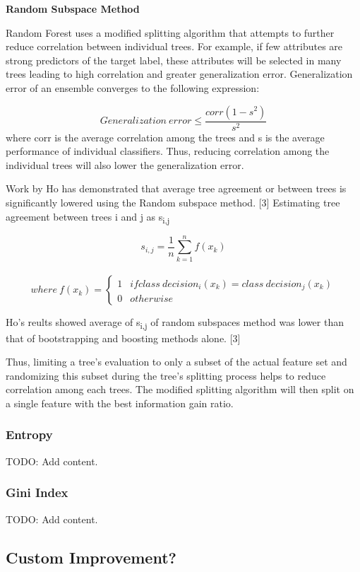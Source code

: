 \documentclass{article} %
\begin{document}
\textbf{Random Subspace Method}

Random Forest uses a modified splitting algorithm that attempts to further reduce correlation between individual trees. For example, if few attributes are strong predictors of the target label, these attributes will be selected in many trees leading to high correlation and greater generalization error.  Generalization error of an ensemble converges to the following expression:

\[Generalization\ error \leq \frac{corr(1-s^2)}{s^2}\] where corr is the average correlation among the trees and s is the average performance of individual classifiers. Thus, reducing correlation among the individual trees will also lower the generalization error.

 Work by Ho has demonstrated that average tree agreement or between trees is significantly lowered using the Random subspace method. [3] 
Estimating tree agreement between trees i and j as s\textsubscript{i,j}

\[ s_{i,j} = \frac{1}{n}\sum_{k=1}^{n}f(x_k)\]
\
\[ where \ f(x_k) = \begin{cases} 
      1 & if class\ decision_i(x_k) = class \ decision_j(x_k) \\
      0 & otherwise
   \end{cases}
\]

Ho's reults showed average of s\textsubscript{i,j} of random subspaces method was lower than that of bootstrapping and boosting methods alone. [3]

 Thus, limiting a tree's evaluation to only a subset of the actual feature set and  randomizing this subset during the tree's splitting  process helps to reduce correlation among each trees. The modified splitting algorithm will then split on a single feature with the best information gain ratio.

\subsubsection{Entropy}
TODO: Add content.

\subsubsection{Gini Index}
TODO: Add content.

\subsection{Custom Improvement?}
\end{document}
